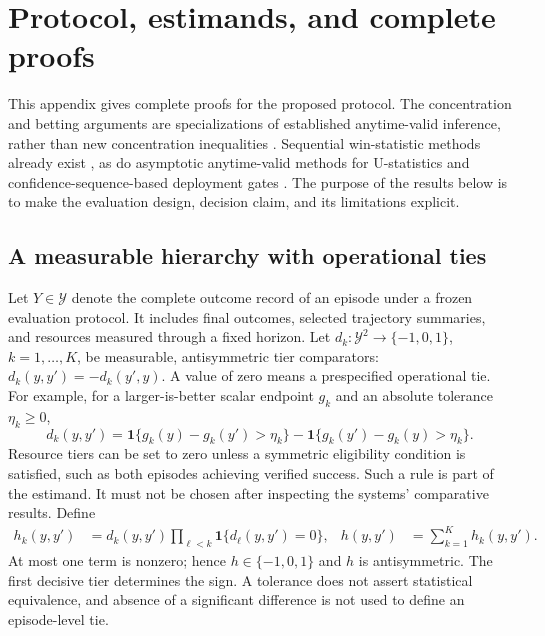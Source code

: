 
\section{Protocol, estimands, and complete proofs}
\label{app:theory}

This appendix gives complete proofs for the proposed protocol. The
concentration and betting arguments are specializations of established
anytime-valid inference, rather than new concentration inequalities
\citep{howard2021confidence,waudbysmith2024betting}. Sequential win-statistic
methods already exist \citep{zhang2024sequential,bergemann2026group}, as do
asymptotic anytime-valid methods for U-statistics
\citep{cai2026ustatistics} and confidence-sequence-based deployment gates
\citep{karampatziakis2021offpolicy}. The purpose of the results below is to
make the evaluation design, decision claim, and its limitations explicit.

\subsection{A measurable hierarchy with operational ties}

Let $Y\in\mathcal Y$ denote the complete outcome record of an episode under
a frozen evaluation protocol. It includes final outcomes, selected
trajectory summaries, and resources measured through a fixed horizon.
Let $d_k:\mathcal Y^2\to\{-1,0,1\}$, $k=1,\ldots,K$, be measurable,
antisymmetric tier comparators:
$d_k(y,y')=-d_k(y',y)$. A value of zero means a prespecified operational
tie. For example, for a larger-is-better scalar endpoint $g_k$ and an
absolute tolerance $\eta_k\geq0$,
\[
 d_k(y,y')=\mathbf1\{g_k(y)-g_k(y')>\eta_k\}
           -\mathbf1\{g_k(y')-g_k(y)>\eta_k\}.
\]
Resource tiers can be set to zero unless a symmetric eligibility condition
is satisfied, such as both episodes achieving verified success. Such a
rule is part of the estimand. It must not be chosen after inspecting the
systems' comparative results. Define
\begin{align}
 h_k(y,y')&=d_k(y,y')\prod_{\ell<k}\mathbf1\{d_\ell(y,y')=0\},
 & h(y,y')&=\sum_{k=1}^K h_k(y,y'). \label{eq:hierarchy_kernel}
\end{align}
At most one term is nonzero; hence $h\in\{-1,0,1\}$ and $h$ is
antisymmetric. The first decisive tier determines the sign. A tolerance
does not assert statistical equivalence, and absence of a significant
difference is not used to define an episode-level tie.

